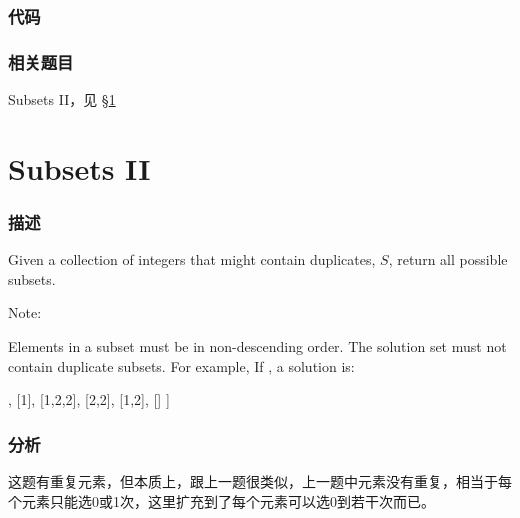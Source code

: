 \subsubsection{代码}
\begin{Code}

\end{Code}

\subsubsection{相关题目}
\begindot
\item Subsets II，见 \S \ref{sec:subsets-ii}
\myenddot


\section{Subsets II} %
\label{sec:subsets-ii}


\subsubsection{描述}
Given a collection of integers that might contain duplicates, $S$, return all possible subsets.

Note:

Elements in a subset must be in non-descending order.
The solution set must not contain duplicate subsets.
For example,
If , a solution is:
\begin{Code}
[
  [2],
  [1],
  [1,2,2],
  [2,2],
  [1,2],
  []
]
\end{Code}


\subsubsection{分析}
这题有重复元素，但本质上，跟上一题很类似，上一题中元素没有重复，相当于每个元素只能选0或1次，这里扩充到了每个元素可以选0到若干次而已。


